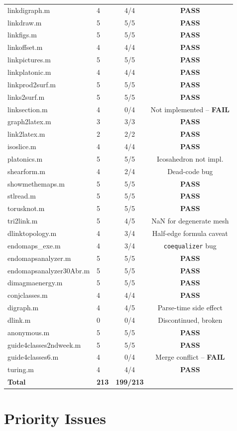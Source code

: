 \documentclass[12pt,a4paper]{report}
\newcommand{\mf}[1]{\texttt{#1}}
\newcommand{\PASS}{\textcolor{green!60!black}{\textbf{PASS}}}
\newcommand{\FAIL}{\textcolor{red!70!black}{\textbf{FAIL}}}
\begin{document}
\begin{longtable}{@{}llcc@{}}
linkdigraph.m & 4 & 4/4 & \PASS\\
linkdraw.m & 5 & 5/5 & \PASS\\
linkfigs.m & 5 & 5/5 & \PASS\\
linkoffset.m & 4 & 4/4 & \PASS\\
linkpictures.m & 5 & 5/5 & \PASS\\
linkplatonic.m & 4 & 4/4 & \PASS\\
linkprod2surf.m & 5 & 5/5 & \PASS\\
links2surf.m & 5 & 5/5 & \PASS\\
linksection.m & 4 & 0/4 & Not implemented -- \FAIL\\
graph2latex.m & 3 & 3/3 & \PASS\\
link2latex.m & 2 & 2/2 & \PASS\\
isoslice.m & 4 & 4/4 & \PASS\\
platonics.m & 5 & 5/5 & Icosahedron not impl.\\
shearform.m & 4 & 2/4 & Dead-code bug\\
showmethemaps.m & 5 & 5/5 & \PASS\\
stlread.m & 5 & 5/5 & \PASS\\
torusknot.m & 5 & 5/5 & \PASS\\
tri2link.m & 5 & 4/5 & NaN for degenerate mesh\\
dlinktopology.m & 4 & 3/4 & Half-edge formula caveat\\
endomaps\_exe.m & 4 & 3/4 & \mf{coequalizer} bug\\
endomapsanalyzer.m & 5 & 5/5 & \PASS\\
endomapsanalyzer30Abr.m & 5 & 5/5 & \PASS\\
dimagmaenergy.m & 5 & 5/5 & \PASS\\
conjclasses.m & 4 & 4/4 & \PASS\\
digraph.m & 4 & 4/5 & Parse-time side effect\\
dlink.m & 0 & 0/4 & Discontinued, broken\\
anonymous.m & 5 & 5/5 & \PASS\\
guide4classes2ndweek.m & 5 & 5/5 & \PASS\\
guide4classes6.m & 4 & 0/4 & Merge conflict -- \FAIL\\
turing.m & 4 & 4/4 & \PASS\\
\midrule
\textbf{Total} & \textbf{213} & \textbf{199/213} & \\
\end{longtable}

\section*{Priority Issues}
\end{document}
